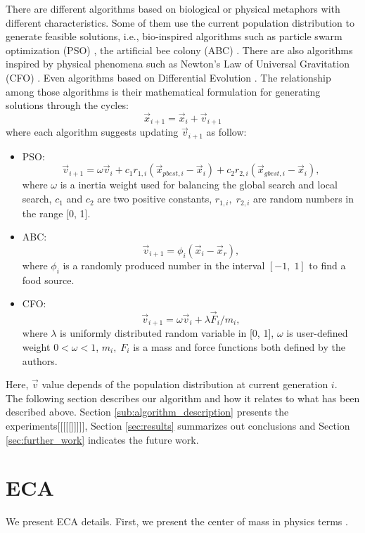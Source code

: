 \documentclass[graybox]{svmult}
\begin{document}
There are different algorithms based on biological or physical metaphors with different characteristics. Some of them use the current population distribution to generate feasible solutions, i.e., bio-inspired algorithms such as particle swarm optimization (PSO) \cite{pso1995}, the artificial bee colony (ABC) \cite{abc2005}. There are also algorithms inspired by physical phenomena such as Newton's Law of Universal Gravitation (CFO) \cite{fisicaSurvey, cfo2007}. Even algorithms based on Differential Evolution  \cite{jso2017, ed1995}. The relationship among those algorithms  is their mathematical formulation for generating solutions through the cycles:
%
\begin{equation}
	\vec{x}_{i + 1} = \vec{x}_{i} + \vec{v}_{i + 1}
	\label{eqn:xxv}
\end{equation}
%
where each algorithm suggests updating $\vec{v}_{i+1} $ as follow:
\begin{itemize}
	\item PSO:
		$$
			\vec{v}_{i + 1} = \omega \vec{v}_{i} +  
					c_1 r_{1, i} ( \vec{x}_{pbest, i} - \vec{x}_i ) + 
					c_2 r_{2, i} ( \vec{x}_{gbest, i} - \vec{x}_i ),
		$$
		where $\omega$ is a inertia weight used for balancing the global search and local search, $c_1$ and $c_2$ are two positive constants, $r_{1, i},\; r_{2, i}$ are random numbers in the range [0, 1].
	\item ABC:
		$$
			\vec{v}_{i + 1} = \phi_i (\vec{x}_i - \vec{x}_{r}),
		$$
	where $\phi_i$ is a randomly produced number in the interval $[-1,\;1]$ to find a food source.
	\item CFO: $$
		\vec{v}_{i + 1} = \omega \vec{v}_{i} + {\lambda \vec{F}_{i}} / {m_i},
		$$
		where $\lambda$ is uniformly distributed random variable in [0, 1], $\omega$ is user-defined weight $0 < \omega < 1$, $m_i,\; F_i$ is a mass and force functions both defined by the authors.
\end{itemize}
%
%
Here, $\vec{v}$ value  depends of the population distribution at current generation $i$.\\

The following section describes our algorithm and how it relates to what has been described above. Section \ref{sub:algorithm_description} presents the experiments[[[[[]]]]], Section \ref{sec:results} summarizes out conclusions and Section \ref{sec:further_work} indicates the future work. 

\section{ECA} %
\label{sec:eca}
%
%
We present ECA details. First, we present the center of mass in physics terms \cite{kleppner73,serway}.
\end{document}
